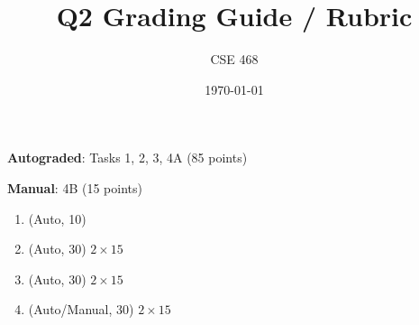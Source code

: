 \documentclass[12pt]{article}
\title{Q2 Grading Guide / Rubric}
\author{CSE 468}
\date{\today}
\begin{document}
\maketitle

\noindent \textbf{Autograded}: Tasks 1, 2, 3, 4A (85 points) 

\noindent \textbf{Manual}: 4B (15 points)

\begin{enumerate}[font=\bfseries]
    \item (Auto, 10) 
    \item (Auto, 30) $2\times15$
    \item (Auto, 30) $2\times15$
    \item (Auto/Manual, 30) $2\times15$
\end{enumerate}
\end{document}
